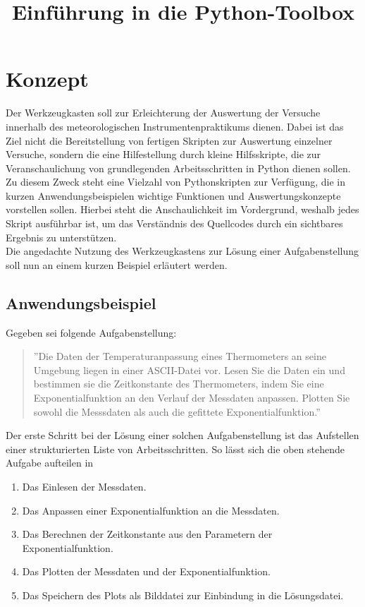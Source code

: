 \documentclass[a4paper]{article}
\title{Einführung in die Python-Toolbox}
\author{}
\date{}
\numberwithin{equation}{section}
\numberwithin{figure}{section}
\begin{document}
\maketitle

\section*{Konzept}
Der Werkzeugkasten soll zur Erleichterung der Auswertung der Versuche innerhalb des meteorologischen Instrumentenpraktikums dienen. Dabei ist das Ziel nicht die Bereitstellung von fertigen Skripten zur Auswertung einzelner Versuche, sondern die eine Hilfestellung durch kleine Hilfsskripte, die zur Veranschaulichung von grundlegenden Arbeitsschritten in Python dienen sollen.\\[2mm]Zu diesem Zweck steht eine Vielzahl von Pythonskripten zur Verfügung, die in kurzen Anwendungsbeispielen wichtige Funktionen und Auswertungskonzepte vorstellen sollen. Hierbei steht die Anschaulichkeit im Vordergrund, weshalb jedes Skript ausführbar ist, um das Verständnis des Quellcodes durch ein sichtbares Ergebnis zu unterstützen.\\[2mm]
Die angedachte Nutzung des Werkzeugkastens zur Lösung einer Aufgabenstellung soll nun an einem kurzen Beispiel erläutert werden.

\subsection*{Anwendungsbeispiel}
Gegeben sei folgende Aufgabenstellung:
\begin{quote}
''Die Daten der Temperaturanpassung eines Thermometers an seine Umgebung liegen in einer ASCII-Datei vor. Lesen Sie die Daten ein und bestimmen sie die Zeitkonstante des Thermometers, indem Sie eine Exponentialfunktion an den Verlauf der Messdaten anpassen. Plotten Sie sowohl die Messsdaten als auch die gefittete Exponentialfunktion.''
\end{quote}
Der erste Schritt bei der Lösung einer solchen Aufgabenstellung ist das Aufstellen einer strukturierten Liste von Arbeitsschritten. So lässt sich die oben stehende Aufgabe aufteilen in
\begin{enumerate}
\item Das Einlesen der Messdaten.
\item Das Anpassen einer Exponentialfunktion an die Messdaten.
\item Das Berechnen der Zeitkonstante aus den Parametern der Exponentialfunktion.
\item Das Plotten der Messdaten und der Exponentialfunktion.
\item Das Speichern des Plots als Bilddatei zur Einbindung in die Lösungsdatei.
\end{enumerate}
\end{document}
